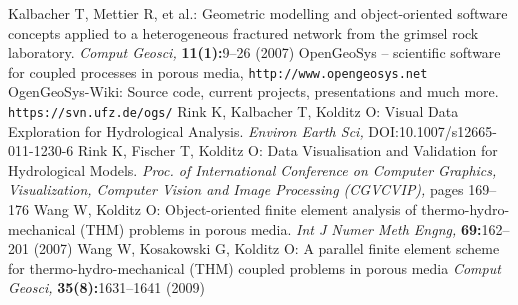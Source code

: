 {}

\begin{thebibliography}{}
Kalbacher T, Mettier R, et al.: Geometric modelling and object-oriented software concepts applied to a heterogeneous fractured network from the grimsel rock laboratory.
\textit{Comput Geosci,} \textbf{11(1):}9--26 (2007)
OpenGeoSys -- scientific software for coupled processes in porous media,
\texttt{http://www.opengeosys.net}
OgenGeoSys-Wiki: Source code, current projects, presentations and much more. \texttt{https://svn.ufz.de/ogs/}
Rink K, Kalbacher T, Kolditz O: Visual Data Exploration for Hydrological Analysis. \textit{Environ Earth Sci,} DOI:10.1007/s12665-011-1230-6
Rink K, Fischer T, Kolditz O: Data Visualisation and Validation for Hydrological Models. \textit{Proc. of International Conference on Computer Graphics, Visualization, Computer Vision and Image Processing (CGVCVIP),} pages 169--176
Wang W, Kolditz O: Object-oriented finite element analysis of thermo-hydro-mechanical (THM) problems in porous media.
\textit{Int J Numer Meth Engng,} \textbf{69:}162--201 (2007)
Wang W, Kosakowski G, Kolditz O: A parallel finite element scheme for thermo-hydro-mechanical (THM) coupled problems in porous media \textit{Comput Geosci,} \textbf{35(8):}1631--1641 (2009)

\end{thebibliography} 